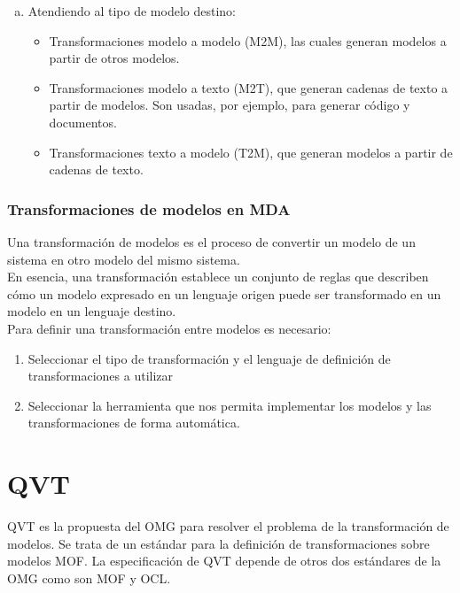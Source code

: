 \begin{enumerate}[a)]
\begin{itemize}
    \end{itemize}
    \item Atendiendo al tipo de modelo destino:
    \begin{itemize}
    	\item Transformaciones modelo a modelo (M2M), las cuales generan modelos a partir de otros modelos.
    	\item Transformaciones modelo a texto (M2T), que generan cadenas de texto a partir de modelos. Son usadas, por ejemplo, para generar código y documentos.
    	\item Transformaciones texto a modelo (T2M), que generan modelos a partir de cadenas de texto.
    \end{itemize}
\end{enumerate}

\subsubsection*{Transformaciones de modelos en MDA}
\label{Transformaciones de modelos en MDA}

Una transformación de modelos es el proceso de convertir un modelo de un sistema en otro modelo del mismo sistema.\\

En esencia, una transformación establece un conjunto de reglas que describen cómo un modelo expresado en un lenguaje origen puede ser transformado en un modelo en un lenguaje destino.\\

Para definir una transformación entre modelos es necesario:
\begin{enumerate}[1.]
	\item Seleccionar el tipo de transformación y el lenguaje de definición de transformaciones a utilizar 
	\item Seleccionar la herramienta que nos permita implementar los modelos y las transformaciones de forma automática.	
\end{enumerate}

\section{QVT}
\label{QVT}

QVT es la propuesta del OMG para resolver el problema de la transformación de modelos. Se trata de un estándar para la definición de transformaciones sobre modelos MOF.  La especificación de QVT depende de otros dos estándares de la OMG como son MOF y OCL.\\

